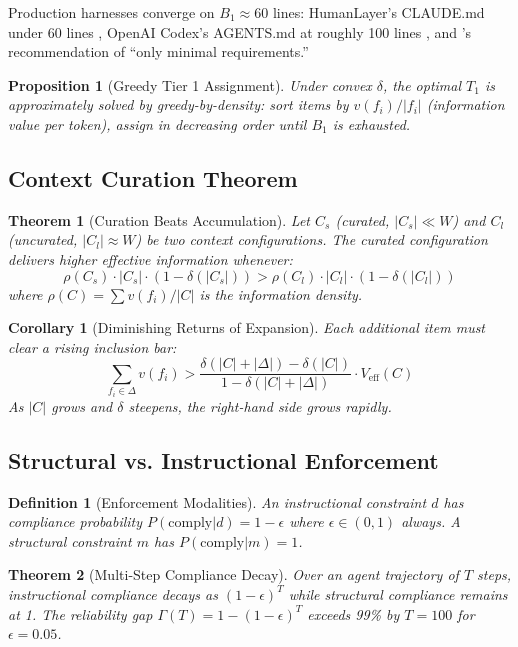 \documentclass[11pt, a4paper, logo, copyright]{googledeepmind}
\newtheorem{definition}{Definition}[section]
\newtheorem{theorem}{Theorem}[section]
\newtheorem{proposition}{Proposition}[section]
\newtheorem{corollary}{Corollary}[section]
\begin{document}
Production harnesses converge on $B_1 \approx 60$ lines: HumanLayer's CLAUDE.md under 60 lines \citep{humanlayer2025skillissue}, OpenAI Codex's AGENTS.md at roughly 100 lines \citep{openai2025codex}, and \citet{gloaguen2026agents}'s recommendation of ``only minimal requirements.''

\begin{proposition}[Greedy Tier 1 Assignment]
Under convex $\delta$, the optimal $T_1$ is approximately solved by greedy-by-density: sort items by $v(f_i)/|f_i|$ (information value per token), assign in decreasing order until $B_1$ is exhausted.
\end{proposition}

\subsection{Context Curation Theorem}

\begin{theorem}[Curation Beats Accumulation]
\label{thm:curation}
Let $C_s$ (curated, $|C_s| \ll W$) and $C_l$ (uncurated, $|C_l| \approx W$) be two context configurations. The curated configuration delivers higher effective information whenever:
$$\rho(C_s) \cdot |C_s| \cdot (1 - \delta(|C_s|)) > \rho(C_l) \cdot |C_l| \cdot (1 - \delta(|C_l|))$$
where $\rho(C) = \sum v(f_i) / |C|$ is the information density.
\end{theorem}

\begin{corollary}[Diminishing Returns of Expansion]
Each additional item must clear a rising inclusion bar:
$$\sum_{f_i \in \Delta} v(f_i) > \frac{\delta(|C| + |\Delta|) - \delta(|C|)}{1 - \delta(|C| + |\Delta|)} \cdot V_{\text{eff}}(C)$$
As $|C|$ grows and $\delta$ steepens, the right-hand side grows rapidly.
\end{corollary}

\subsection{Structural vs. Instructional Enforcement}

\begin{definition}[Enforcement Modalities]
An \emph{instructional constraint} $d$ has compliance probability $P(\text{comply}|d) = 1 - \epsilon$ where $\epsilon \in (0,1)$ always. A \emph{structural constraint} $m$ has $P(\text{comply}|m) = 1$.
\end{definition}

\begin{theorem}[Multi-Step Compliance Decay]
\label{thm:compliance}
Over an agent trajectory of $T$ steps, instructional compliance decays as $(1-\epsilon)^T$ while structural compliance remains at 1. The reliability gap $\Gamma(T) = 1 - (1-\epsilon)^T$ exceeds 99\% by $T = 100$ for $\epsilon = 0.05$.
\end{theorem}
\end{document}

